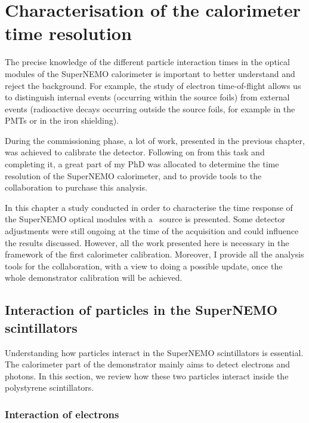 \chapter{Characterisation of the calorimeter time resolution}
\label{ch:Cobalt_study}

The precise knowledge of the different particle interaction times in the optical modules of the SuperNEMO calorimeter is important to better understand and reject the background.
For example, the study of electron time-of-flight allows us to distinguish internal events (occurring within the source foils) from external events (radioactive decays occurring outside the source foils, for example in the PMTs or in the iron shielding).

During the commissioning phase, a lot of work, presented in the previous chapter, was achieved to calibrate the detector.
Following on from this task and completing it, a great part of my PhD was allocated to determine the time resolution of the SuperNEMO calorimeter, and to provide tools to the collaboration to purchase this analysis.

In this chapter a study conducted in order to characterise the time response of the SuperNEMO optical modules with a \Co\ source is presented.
Some detector adjustments were still ongoing at the time of the acquisition and could influence the results discussed.
However, all the work presented here is necessary in the framework of the first calorimeter calibration.
Moreover, I provide all the analysis tools for the collaboration, with a view to doing a possible update, once the whole demonstrator calibration will be achieved.


\section{Interaction of particles in the SuperNEMO scintillators}
\label{sec:scintillator_interactions}

Understanding how particles interact in the SuperNEMO scintillators is essential.
The calorimeter part of the demonstrator mainly aims to detect electrons and photons.
In this section, we review how these two particles interact inside the polystyrene scintillators.


\subsection{Interaction of electrons}

